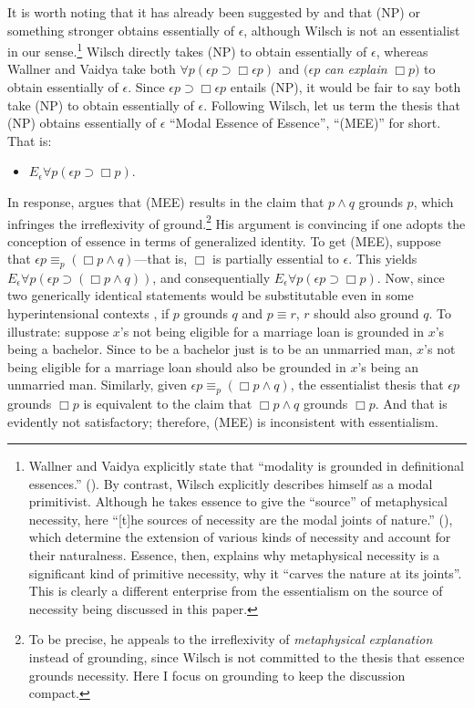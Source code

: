 \documentclass[12pt]{article}
\begin{document}
It is worth noting that it has already been suggested by \citet{Wilsch2017-WILSMP-3} and \citet{Wallner2020-WALEEA-6} that (NP) or something stronger obtains essentially of $\epsilon$, although Wilsch is not an essentialist in our sense.\footnote{
Wallner and Vaidya explicitly state that ``modality is grounded in definitional essences.'' (\citeyear[431]{Wallner2020-WALEEA-6}). By contrast, Wilsch explicitly describes himself as a modal primitivist. Although he takes essence to give the ``source'' of metaphysical necessity, here ``[t]he sources of necessity are the modal joints of nature.'' (\citeyear[429]{Wilsch2017-WILSMP-3}), which determine the extension of various kinds of necessity and account for their naturalness. Essence, then, explains why metaphysical necessity is a significant kind of primitive necessity, why it ``carves the nature at its joints''. This is clearly a different enterprise from the essentialism on the source of necessity being discussed in this paper.}
Wilsch directly takes (NP) to obtain essentially of $\epsilon$, whereas Wallner and Vaidya take both $\forall p (\epsilon p \supset \Box \epsilon p)$ and $(\epsilon p$ \textit{can explain} $\Box p)$ to obtain essentially of $\epsilon$. Since $\epsilon p \supset \Box \epsilon p$ entails (NP), it would be fair to say both take (NP) to obtain essentially of $\epsilon$. Following Wilsch, let us term the thesis that (NP) obtains essentially of $\epsilon$ ``Modal Essence of Essence'', ``(MEE)'' for short. That is: 
\begin{itemize}
    \item[(MEE)] $E_\epsilon \forall p (\epsilon p \supset \Box p)$.
\end{itemize}
\par
In response, \citet{Romero2023-CAROEN} argues that (MEE) results in the claim that $p \land q$ grounds $p$, which infringes the irreflexivity of ground.\footnote{To be precise, he appeals to the irreflexivity of \textit{metaphysical explanation} instead of grounding, since Wilsch is not committed to the thesis that essence grounds necessity. Here I focus on grounding to keep the discussion compact.} His argument is convincing if one adopts the conception of essence in terms of generalized identity. To get (MEE), suppose that $\epsilon p \equiv_p (\Box p \land q)$---that is, $\Box$ is partially essential to $\epsilon$. This yields $E_{\epsilon} \forall p(\epsilon p \supset (\Box p \land q))$, and consequentially $E_{\epsilon} \forall p(\epsilon p \supset \Box p)$. Now, since two generically identical statements would be substitutable even in some hyperintensional contexts \citep{Dorr2016-DORTBF-2, Rayo2013-RAYTCO-4}, if $p$ grounds $q$ and $p \equiv r$, $r$ should also ground $q$. To illustrate: suppose $x$'s not being eligible for a marriage loan is grounded in $x$'s being a bachelor. Since to be a bachelor just is to be an unmarried man, $x$'s not being eligible for a marriage loan should also be grounded in $x$'s being an unmarried man. Similarly, given $\epsilon p \equiv_p (\Box p \land q)$, the essentialist thesis that $\epsilon p$ grounds $\Box p$ is equivalent to the claim that $\Box p \land q$ grounds $\Box p$. And that is evidently not satisfactory; therefore, (MEE) is inconsistent with essentialism. 
\end{document}
